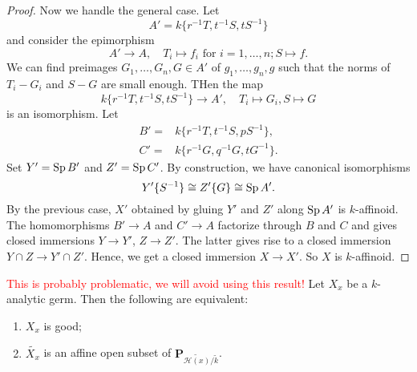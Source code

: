 \begin{proof}
    Now we handle the general case. Let
    \[
        A'=  k\{r^{-1}T,t^{-1}S,tS^{-1}\}
    \]
    and consider the epimorphism
    \[
        A'\rightarrow A,\quad T_i\mapsto f_i\text{ for }i=1,\ldots,n; S\mapsto f.  
    \]
    We can find preimages $G_1,\ldots,G_n,G\in A'$ of $g_1,\ldots,g_n,g$ such that the norms of $T_i-G_i$ and $S-G$ are small enough. THen the map
    \[
        k\{r^{-1}T,t^{-1}S,tS^{-1}\}\rightarrow A',\quad T_i\mapsto G_i,S\mapsto G
    \]
    is an isomorphism. Let
    \[
        \begin{aligned}
            B'= & k\{r^{-1}T,t^{-1}S,pS^{-1}\},\\
            C'= & k\{r^{-1}G,q^{-1}G,tG^{-1}\}.
        \end{aligned}  
    \]
    Set $Y'=\operatorname{Sp} B'$ and $Z'=\operatorname{Sp} C'$. By construction, we have canonical isomorphisms
    \[
        Y'\{S^{-1}\}\cong Z'\{G\}\cong \operatorname{Sp} A'.  
    \]
    By the previous case, $X'$ obtained by gluing $Y'$ and $Z'$ along $\operatorname{Sp} A'$ is $k$-affinoid. The homomorphisms $B'\rightarrow A$ and $C'\rightarrow A$ factorize through $B$ and $C$ and gives closed immersions $Y\rightarrow Y'$, $Z\rightarrow Z'$. The latter gives rise to a closed immersion $Y\cap Z\rightarrow Y'\cap Z'$. Hence, we get a closed immersion $X\rightarrow X'$. So $X$ is $k$-affinoid.
\end{proof}


\begin{thm}\label{thm-goodgermandreduction}\textcolor{red}{This is probably problematic, we will avoid using this result!}
    Let $X_x$ be a $k$-analytic germ. Then the following are equivalent:
    \begin{enumerate}
        \item $X_x$ is good;
        \item $\widetilde{X_x}$ is an affine open subset of $\mathbf{P}_{\widetilde{\mathscr{H}(x)}/\tilde{k}}$.
    \end{enumerate}
\end{thm}

